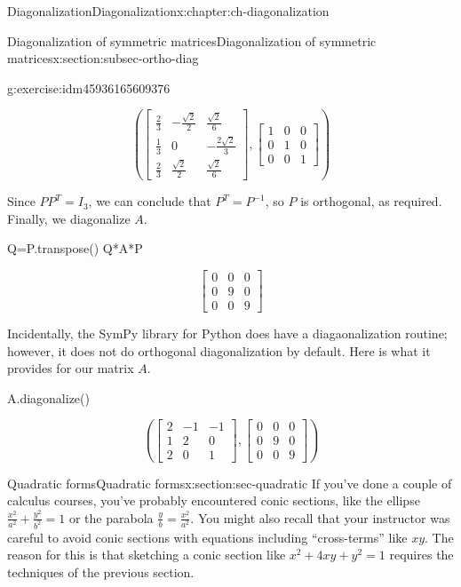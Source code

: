 \documentclass[oneside,10pt,]{book}
\numberwithin{equation}{section}
\newcommand{\bbm}{\begin{bmatrix}}
\newcommand{\ebm}{\end{bmatrix}}
\newcommand{\amp}{&}
\begin{document}
\begin{chapterptx}{Diagonalization}{}{Diagonalization}{}{}{x:chapter:ch-diagonalization}
\begin{sectionptx}{Diagonalization of symmetric matrices}{}{Diagonalization of symmetric matrices}{}{}{x:section:subsec-ortho-diag}
\begin{inlineexercise}{}{g:exercise:idm45936165609376}
\begin{sageoutput}
\[\left(\bbm \frac23 \amp -\frac{\sqrt{2}}{2}\amp \frac{\sqrt{2}}{6}\\ \frac13\amp 0\amp -\frac{2\sqrt{2}}{3}\\ \frac23 \amp \frac{\sqrt{2}}{2} \amp \frac{\sqrt{2}}{6}\ebm,
\bbm 1\amp 0\amp 0\\0\amp 1\amp 0\\0\amp 0\amp 1\ebm\right)\]
\end{sageoutput}
Since \(PP^T=I_3\), we can conclude that \(P^T=P^{-1}\), so \(P\) is orthogonal, as required. Finally, we diagonalize \(A\).%
\begin{sageinput}
Q=P.transpose()
Q*A*P
\end{sageinput}
\begin{sageoutput}
\[\bbm 0\amp 0\amp 0\\0\amp 9\amp 0\\0\amp 0\amp 9\ebm\]
\end{sageoutput}
Incidentally, the SymPy library for Python does have a diagaonalization routine; however, it does not do orthogonal diagonalization by default. Here is what it provides for our matrix \(A\).%
\begin{sageinput}
A.diagonalize()
\end{sageinput}
\begin{sageoutput}
\[\left(\bbm 2\amp -1\amp -1\\1\amp 2\amp 0\\2\amp 0\amp 1\ebm, \bbm 0\amp 0\amp 0\\0\amp 9\amp 0\\0\amp 0\amp 9\ebm\right)\]
\end{sageoutput}
\end{inlineexercise}%
\end{sectionptx}
%
%
\typeout{************************************************}
\typeout{************************************************}
%
\begin{sectionptx}{Quadratic forms}{}{Quadratic forms}{}{}{x:section:sec-quadratic}
If you've done a couple of calculus courses, you've probably encountered conic sections, like the ellipse \(\frac{x^2}{a^2}+\frac{y^2}{b^2}=1\) or the parabola \(\frac{y}{b}=\frac{x^2}{a^2}\). You might also recall that your instructor was careful to avoid conic sections with equations including ``cross-terms'' like \(xy\). The reason for this is that sketching a conic section like \(x^2+4xy+y^2=1\) requires the techniques of the previous section.%

\end{sectionptx}
\end{chapterptx}
\end{document}
